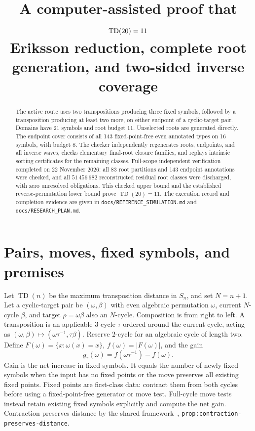 \documentclass[11pt,a4paper]{article}
\title{A computer-assisted proof that $\TD(20)=11$\\
\large Eriksson reduction, complete root generation, and two-sided inverse coverage}
\author{}\date{}
\newcommand{\TD}{\operatorname{TD}}
\begin{document}
\setlength{\emergencystretch}{3em}\maketitle
\begin{abstract}
The active route uses two transpositions producing three fixed symbols, followed
by a transposition producing at least two more, on either endpoint of a
cyclic-target pair. Domains have 21 symbols and root budget 11.
Unselected roots are generated directly. The endpoint cover consists of all
143 fixed-point-free even annotated types on 16 symbols, with budget
8. The checker independently regenerates roots, endpoints, and all inverse
waves, checks elementary final-root closure families, and replays intrinsic
sorting certificates for the remaining classes. Full-scope independent
verification completed on 22 November 2026: all 83 root partitions and 143
endpoint annotations were checked, and all $51\,456\,682$ reconstructed
residual root classes were discharged, with zero unresolved obligations.
This checked upper bound and the established reverse-permutation lower bound
prove $\TD(20)=11$. The execution record and completion evidence are given in
\nolinkurl{docs/REFERENCE_SIMULATION.md} and
\nolinkurl{docs/RESEARCH_PLAN.md}.
\end{abstract}
\section{Pairs, moves, fixed symbols, and premises}
Let $\TD(n)$ be the maximum transposition distance in $S_n$, and set $N=n+1$. Let a cyclic-target pair be $(\omega,\beta)$ with even algebraic
permutation $\omega$, current $N$-cycle $\beta$, and target $\rho=\omega\beta$
also an $N$-cycle. Composition is from right to left. A transposition is an
applicable $3$-cycle $\tau$ ordered around the current cycle, acting as
$(\omega,\beta)\mapsto(\omega\tau^{-1},\tau\beta)$. Reserve $2$-cycle for an
algebraic cycle of length two. Define
$F(\omega)=\{x:\omega(x)=x\}$, $f(\omega)=|F(\omega)|$, and the gain
\[
g_\tau(\omega)=f(\omega\tau^{-1})-f(\omega).
\]
Gain is the net increase in fixed symbols. It equals the number of newly fixed
symbols when the input has no fixed points or the move preserves all existing
fixed points. Fixed points are first-class data: contract them from both cycles
before using a fixed-point-free generator or move test. Full-cycle move tests
instead retain existing fixed symbols explicitly and compute the net gain.
Contraction preserves distance
by the shared framework~\cite{framework},
\nolinkurl{prop:contraction-preserves-distance}.
\end{document}
